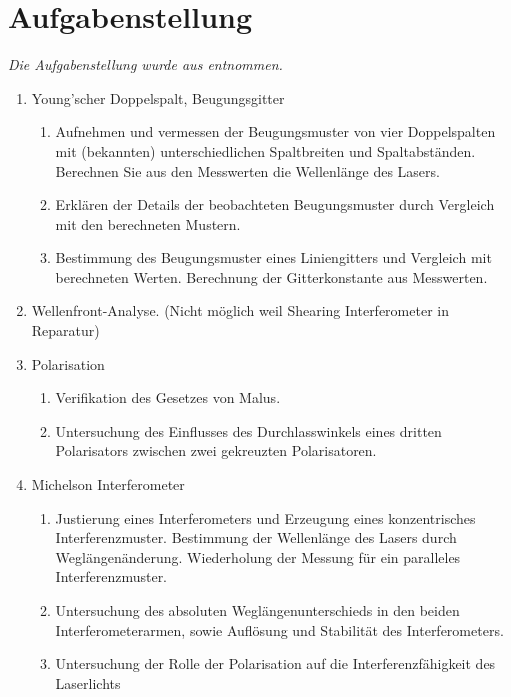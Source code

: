 \section{Aufgabenstellung}
\label{sec:Aufgabenstellung}
\textit{Die Aufgabenstellung wurde aus \cite{LAB} entnommen.}
\begin{enumerate}
    \item Young'scher Doppelspalt, Beugungsgitter
    \begin{enumerate}
        \item Aufnehmen und vermessen der Beugungsmuster von vier Doppelspalten mit (bekannten) unterschiedlichen Spaltbreiten und Spaltabständen. Berechnen Sie aus den Messwerten die Wellenlänge des Lasers.
        \item Erklären der Details der beobachteten Beugungsmuster durch Vergleich mit den berechneten Mustern.
        \item Bestimmung des Beugungsmuster eines Liniengitters und Vergleich mit berechneten Werten. Berechnung der Gitterkonstante aus Messwerten.
    \end{enumerate}
    \item Wellenfront-Analyse. (Nicht möglich weil Shearing Interferometer in Reparatur)
    \item Polarisation
    \begin{enumerate}
        \item Verifikation des Gesetzes von Malus.
        \item Untersuchung des Einflusses des Durchlasswinkels eines dritten Polarisators zwischen zwei gekreuzten Polarisatoren.
    \end{enumerate}
    \item Michelson Interferometer
    \begin{enumerate}
        \item Justierung eines Interferometers und Erzeugung eines konzentrisches Interferenzmuster. Bestimmung der Wellenlänge des Lasers durch Weglängenänderung. Wiederholung der Messung für ein paralleles Interferenzmuster.
        \item Untersuchung des absoluten Weglängenunterschieds in den beiden Interferometerarmen, sowie Auflösung und Stabilität des Interferometers.
        \item Untersuchung der Rolle der Polarisation auf die Interferenzfähigkeit des Laserlichts
    \end{enumerate}
\end{enumerate}
\newpage